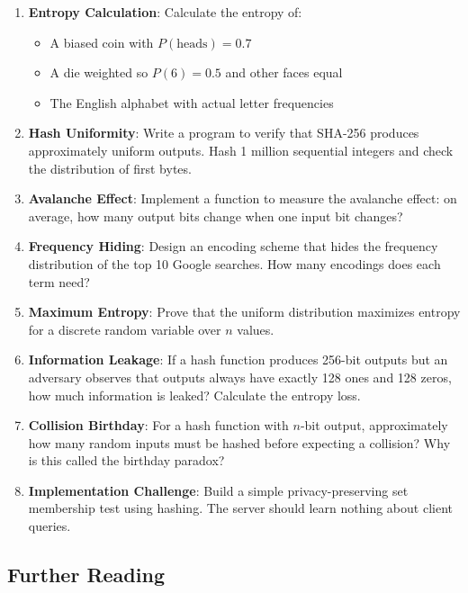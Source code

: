 \begin{enumerate}
    \item \textbf{Entropy Calculation}: Calculate the entropy of:
    \begin{itemize}
        \item A biased coin with $P(\text{heads}) = 0.7$
        \item A die weighted so $P(6) = 0.5$ and other faces equal
        \item The English alphabet with actual letter frequencies
    \end{itemize}
    
    \item \textbf{Hash Uniformity}: Write a program to verify that SHA-256 produces approximately uniform outputs. Hash 1 million sequential integers and check the distribution of first bytes.
    
    \item \textbf{Avalanche Effect}: Implement a function to measure the avalanche effect: on average, how many output bits change when one input bit changes?
    
    \item \textbf{Frequency Hiding}: Design an encoding scheme that hides the frequency distribution of the top 10 Google searches. How many encodings does each term need?
    
    \item \textbf{Maximum Entropy}: Prove that the uniform distribution maximizes entropy for a discrete random variable over $n$ values.
    
    \item \textbf{Information Leakage}: If a hash function produces 256-bit outputs but an adversary observes that outputs always have exactly 128 ones and 128 zeros, how much information is leaked? Calculate the entropy loss.
    
    \item \textbf{Collision Birthday}: For a hash function with $n$-bit output, approximately how many random inputs must be hashed before expecting a collision? Why is this called the birthday paradox?
    
    \item \textbf{Implementation Challenge}: Build a simple privacy-preserving set membership test using hashing. The server should learn nothing about client queries.
\end{enumerate}

\subsection{Further Reading}

